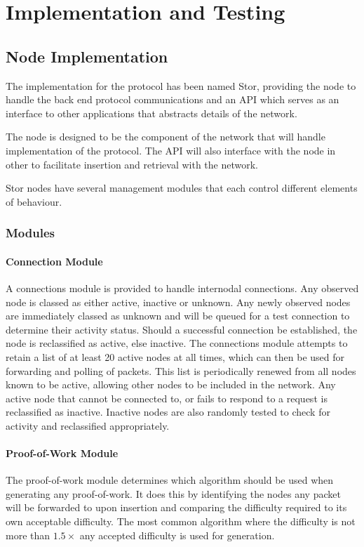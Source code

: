 \section{Implementation and Testing}
	\subsection{Node Implementation}
		The implementation for the protocol has been named Stor, providing the node to handle the back end protocol communications and an API which serves as an interface to other applications that abstracts details of the network.
	
		The node is designed to be the component of the network that will handle implementation of the protocol. The API will also interface with the node in other to facilitate insertion and retrieval with the network.
		
		Stor nodes have several management modules that each control different elements of behaviour.
		\subsubsection*{Modules}
			\paragraph*{Connection Module}
				A connections module is provided to handle internodal connections. Any observed node is classed as either active, inactive or unknown. Any newly observed nodes are immediately classed as unknown and will be queued for a test connection to determine their activity status. Should a successful connection be established, the node is reclassified as active, else inactive. The connections module attempts to retain a list of at least 20 active nodes at all times, which can then be used for forwarding and polling of packets. This list is periodically renewed from all nodes known to be active, allowing other nodes to be included in the network. Any active node that cannot be connected to, or fails to respond to a request is reclassified as inactive. Inactive nodes are also randomly tested to check for activity and reclassified appropriately.
			\paragraph{Proof-of-Work Module}
				The proof-of-work module determines which algorithm should be used when generating any proof-of-work. It does this by identifying the nodes any packet will be forwarded to upon insertion and comparing the difficulty required to its own acceptable difficulty. The most common algorithm where the difficulty is not more than $1.5\times$ any accepted difficulty is used for generation.
